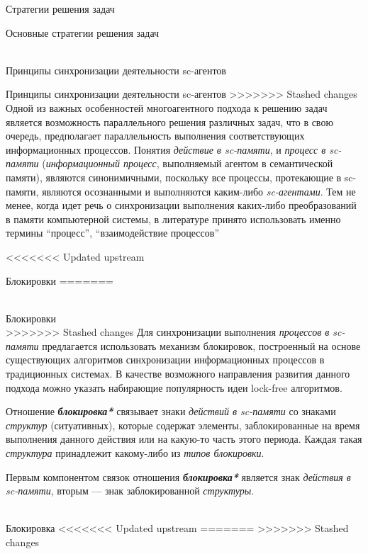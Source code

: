 \begin{frame}{Стратегии решения задач}
\begin{frame}{\large Основные стратегии решения задач}
\begin{textitemize}
\begin{frame}{\\Принципы синхронизации деятельности sc-агентов}
\begin{frame}{Принципы синхронизации деятельности sc-агентов}
>>>>>>> Stashed changes
        Одной из важных особенностей многоагентного подхода к решению задач является возможность параллельного решения различных задач, что в свою очередь, предполагает параллельность выполнения соответствующих информационных процессов.
        Понятия \textit{действие в sc-памяти}, и \textit{процесс в sc-памяти} (\textit{информационный процесс}, выполняемый агентом в семантической памяти), являются синонимичными, поскольку все процессы, протекающие в sc-памяти, являются осознанными и выполняются каким-либо \textit{sc-агентами}. Тем не менее, когда идет речь о синхронизации выполнения каких-либо преобразований в памяти компьютерной системы, в литературе принято использовать именно термины ``процесс'', ``взаимодействие процессов''
\end{frame}

<<<<<<< Updated upstream
\begin{frame}{Блокировки}
=======
\begin{frame}{\\Блокировки}
\topline
\vspace{30}
 \\

>>>>>>> Stashed changes
Для синхронизации выполнения \textit{процессов в sc-памяти} предлагается использовать механизм блокировок, построенный на основе существующих алгоритмов синхронизации информационных процессов в традиционных системах. В качестве возможного направления развития данного подхода можно указать набирающие популярность идеи lock-free алгоритмов.

Отношение \textbf{\textit{блокировка*}} связывает знаки \textit{действий в sc-памяти} со знаками \textit{структур} (ситуативных), которые содержат элементы, заблокированные на время выполнения данного действия или на какую-то часть этого периода. Каждая такая \textit{структура} принадлежит какому-либо из \textit{типов блокировки}.

Первым компонентом связок отношения \textbf{\textit{блокировка*}} является знак \textit{действия в sc-памяти}, вторым --- знак заблокированной \textit{структуры}.
\end{frame}

\begin{frame}{\\Блокировка}
<<<<<<< Updated upstream
=======
\topline
>>>>>>> Stashed changes
\end{frame}


\end{frame}
\end{frame}
\end{textitemize}
\end{frame}
\end{frame}
